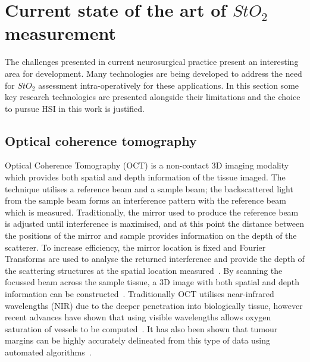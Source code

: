 \section{Current state of the art of $StO_2$ measurement}\label{sec:stateofart}
The challenges presented in current neurosurgical practice present an interesting area for development. Many technologies are being developed to address the need for $StO_2$ assessment intra-operatively for these applications. In this section some key research technologies are presented alongside their limitations and the choice to pursue HSI in this work is justified. 

\subsection{Optical coherence tomography}
Optical Coherence Tomography (OCT) is a non-contact 3D imaging modality which provides both spatial and depth information of the tissue imaged. The technique utilises a reference beam and a sample beam; the backscattered light from the sample beam forms an interference pattern with the reference beam which is measured. Traditionally, the mirror used to produce the reference beam is adjusted until interference is maximised, and at this point the distance between the positions of the mirror and sample provides information on the depth of the scatterer. To increase efficiency, the mirror location is fixed and Fourier Transforms are used to analyse the returned interference and provide the depth of the scattering structures at the spatial location measured~\cite{Fercher2003}. By scanning the focussed beam across the sample tissue, a 3D image with both spatial and depth information can be constructed~\cite{Fercher2003}. Traditionally OCT utilises near-infrared wavelengths (NIR) due to the deeper penetration into biologically tissue, however recent advances have shown that using visible wavelengths allows oxygen saturation of vessels to be computed~\cite{Shu2017}. It has also been shown that tumour margins can be highly accurately delineated from this type of data using automated algorithms~\cite{Sunny2019}. 
